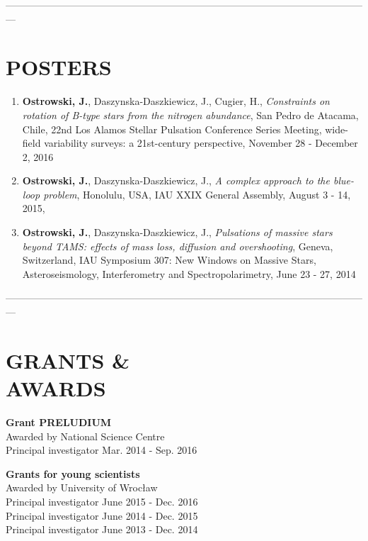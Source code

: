 \documentclass[margin, 10pt]{res} %
\begin{document}
\begin{resume}
---------------------------------------------------------------------------------------------------------------

\section{POSTERS}

\begin{enumerate}
    \item \textbf{Ostrowski, J.}, Daszynska-Daszkiewicz, J., Cugier, H., \textit{Constraints on rotation of B-type stars from the nitrogen abundance}, San Pedro de Atacama, Chile, 22nd Los Alamos Stellar Pulsation Conference Series Meeting, wide-field variability surveys: a 21st-century perspective, November 28 - December 2, 2016
    
    \item \textbf{Ostrowski, J.}, Daszynska-Daszkiewicz, J., \textit{A complex approach to the blue-loop problem}, Honolulu, USA, IAU XXIX General Assembly, August 3 - 14, 2015,

    \item \textbf{Ostrowski, J.}, Daszynska-Daszkiewicz, J., \textit{Pulsations of massive stars beyond TAMS: effects of mass loss, diffusion and overshooting}, Geneva, Switzerland, IAU Symposium 307: New Windows on Massive Stars, Asteroseismology, Interferometry and Spectropolarimetry, June 23 - 27, 2014
\end{enumerate}

---------------------------------------------------------------------------------------------------------------

\section{GRANTS \& \\ AWARDS} 

{\bf Grant PRELUDIUM} \\
Awarded by National Science Centre \\
Principal investigator \hfill Mar. 2014 - Sep. 2016

{\bf Grants for young scientists} \\
Awarded by University of Wroc\l{}aw \\
Principal investigator \hfill June 2015 - Dec. 2016 \\
Principal investigator \hfill June 2014 - Dec. 2015 \\
Principal investigator \hfill June 2013 - Dec. 2014


\end{resume}
\end{document}
